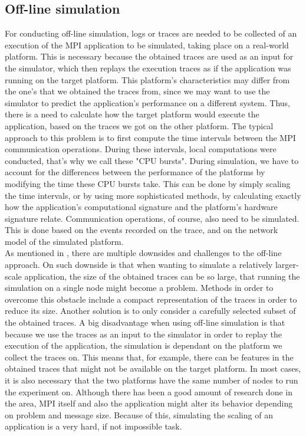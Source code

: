 \subsection{Off-line simulation}
For conducting off-line simulation, logs or traces are needed to be
collected of an execution of the MPI application to be simulated,
taking place on a
real-world platform. This is necessary because the obtained traces are
used as an input for the simulator, which then replays the execution
traces as if the application was running on the target platform. This
platform's characteristics may differ from the one's that we obtained
the traces from, since we may want to use the simulator to predict the
application's performance on a different system. Thus, there is a need
to calculate how the target platform would execute the application,
based on the traces we got on the other platform. The typical approach
to this problem is to first compute the time intervals between the MPI
communication operations. During these intervals, local computations
were conducted, that's why we call these "CPU bursts". During
simulation, we have to account for the differences between the
performance of the platforms by modifying the time these CPU bursts
take. This can be done by simply scaling the time intervals, or by
using more sophisticated methods, by calculating exactly how the
application's computational signature and the platform's hardware
signature relate.\cite{csgscq11} Communication operations, of course,
also need to be simulated. This is done based on the events recorded
on the trace, and on the network model of the simulated
platform.\cite{csgscq11}\\[0.3cm]
As mentioned in \cite{csgscq11}, there are multiple downsides and
challenges to the off-line approach. On such downside is that when
wanting to simulate a relatively larger-scale application, the size of
the obtained traces can be so large, that running the simulation on a
single node might become a problem. Methods in order to overcome this
obstacle include a compact representation of the traces in order to
reduce its size. Another solution is to only consider a carefully
selected subset of the obtained traces. A big disadvantage when using
off-line simulation is that because we use the traces as an input to
the simulator in order to replay the execution of the application, the
simulation is dependant on the platform we collect the traces
on. This means that, for example, there can be features in the
obtained traces that might not be available on the target platform. In
most cases, it is also necessary that the two platforms have the same
number of nodes to run the experiment on. Although there has been a
good amount of research done in the area, MPI itself and also the
application might alter its behavior depending on problem and message
size. Because of this, simulating the scaling of an application is a
very hard, if not impossible task.\cite{bdglmqssv13}
